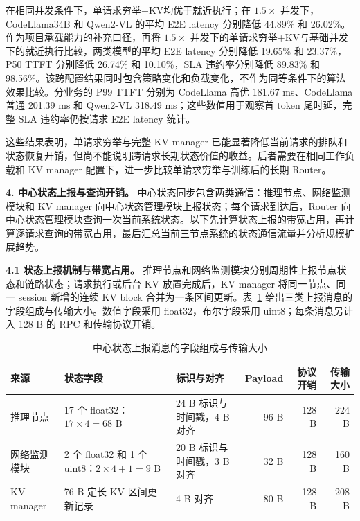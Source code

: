 在相同并发条件下，单请求穷举+KV均优于就近执行；在 \(1.5\times\) 并发下，CodeLlama34B 和 Qwen2-VL 的平均 E2E latency 分别降低 44.89\% 和 26.02\%。作为项目承载能力的补充口径，再将 \(1.5\times\) 并发下的单请求穷举+KV与基础并发下的就近执行比较，两类模型的平均 E2E latency 分别降低 19.65\% 和 23.37\%，P50 TTFT 分别降低 26.74\% 和 10.10\%，SLA 违约率分别降低 89.83\% 和 98.56\%。该跨配置结果同时包含策略变化和负载变化，不作为同等条件下的算法效果比较。分业务的 P99 TTFT 分别为 CodeLlama 高优 181.67 ms、CodeLlama 普通 201.39 ms 和 Qwen2-VL 318.49 ms；这些数值用于观察首 token 尾时延，完整 SLA 违约率仍按请求 E2E latency 统计。

这些结果表明，单请求穷举与完整 KV manager 已能显著降低当前请求的排队和状态恢复开销，但尚不能说明跨请求长期状态价值的收益。后者需要在相同工作负载和 KV manager 配置下，进一步比较单请求穷举与训练后的长期 Router。

\medskip
\noindent\textbf{4. 中心状态上报与查询开销。}
中心状态同步包含两类通信：推理节点、网络监测模块和 KV manager 向中心状态管理模块上报状态；每个请求到达后，Router 向中心状态管理模块查询一次当前系统状态。以下先计算状态上报的带宽占用，再计算逐请求查询的带宽占用，最后汇总当前三节点系统的状态通信流量并分析规模扩展趋势。

\textbf{4.1 状态上报机制与带宽占用。}
推理节点和网络监测模块分别周期性上报节点状态和链路状态；请求执行或后台 KV 放置完成后，KV manager 将同一节点、同一 session 新增的连续 KV block 合并为一条区间更新。表~\ref{tab:control-plane-message-size} 给出三类上报消息的字段组成与传输大小。数值字段采用 float32，布尔字段采用 uint8；每条消息另计入 128 B 的 RPC 和传输协议开销。

\begin{table}[H]
\centering
\footnotesize
\caption{中心状态上报消息的字段组成与传输大小}
\label{tab:control-plane-message-size}
\begin{tabular}{@{}p{}p{}p{}rrr@{}}
\toprule
来源 & 状态字段 & 标识与对齐 & Payload & 协议开销 & 传输大小 \\
\midrule
推理节点
& 17 个 float32：\(17\times4=68\) B
& 24 B 标识与时间戳，4 B 对齐
& 96 B & 128 B & 224 B \\
网络监测模块
& 2 个 float32 和 1 个 uint8：\(2\times4+1=9\) B
& 20 B 标识与时间戳，3 B 对齐
& 32 B & 128 B & 160 B \\
KV manager
& 76 B 定长 KV 区间更新记录
& 4 B 对齐
& 80 B & 128 B & 208 B \\
\bottomrule
\end{tabular}
\end{table}

